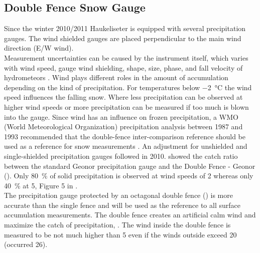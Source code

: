 \subsection{Double Fence Snow Gauge}\label{sec:dofe}

Since the winter 2010/2011 Haukeliseter is equipped with several precipitation gauges. The wind shielded gauges are placed perpendicular to the main wind direction (E/W wind).
\\
Measurement uncertainties can be caused by the instrument itself, which varies with wind speed, gauge wind shielding, shape, size, phase, and fall velocity of hydrometeors \citep{kochendorfer_analysis_2017,wolff_derivation_2015}. Wind plays different roles in the amount of accumulation depending on the kind of precipitation. For temperatures below \SI{-2}{\celsius} the wind speed influences the falling snow. Where less precipitation can be observed at higher wind speeds or more precipitation can be measured if too much is blown into the gauge.
Since wind has an influence on frozen precipitation, a WMO (World Meteorological Organization) precipitation analysis between 1987 and 1993 recommended that the double-fence inter-comparison reference should be used as a reference for snow measurements \citep{goodison_wmo_1998}. An adjustment for unshielded and single-shielded precipitation gauges followed in 2010.
\citet{wolff_derivation_2015} showed the catch ratio between the standard Geonor precipitation gauge and the Double Fence - Geonor (). Only \SI{80}{\percent} of solid precipitation is observed at wind speeds of \SI{2}{\mPs} whereas only \SI{40}{\percent} at \SI{5}{\mPs}, Figure 5 in \citet{wolff_derivation_2015}. 
\\
The precipitation gauge protected by an octagonal double fence () is more accurate than the single fence and will be used as the reference to all surface accumulation measurements. The double fence creates an artificial calm wind and maximize the catch of precipitation, \citep{wolff_new_2010, wolff_measurements_2013, wolff_derivation_2015}. The wind inside the double fence is measured to be not much higher than \SI{5}{\mPs} even if the winds outside exceed \SI{20}{\mPs} (occurred \SI{26}{\dec}). %
